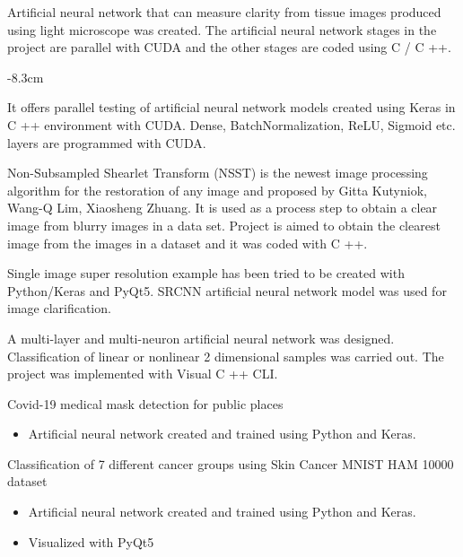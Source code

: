 \documentclass[10pt,a4paper]{altacv}
\begin{document}
 {}

Artificial neural network that can measure clarity from tissue images produced using light microscope was created. The artificial neural network stages in the project are parallel with CUDA and the other stages are coded using C / C ++.

\divider

\smallskip


\begin{adjustwidth}{}{-8.3cm}

It offers parallel testing of artificial neural network models created using Keras in C ++ environment with CUDA. Dense, BatchNormalization, ReLU, Sigmoid etc. layers are programmed with CUDA.

\divider

Non-Subsampled Shearlet Transform (NSST) is the newest image processing algorithm for the restoration of any image and proposed by Gitta Kutyniok, Wang-Q Lim, Xiaosheng Zhuang. It is used as a process step to obtain a clear image from blurry images in a data set. Project is aimed to obtain the clearest image from the images in a dataset and it was coded with C ++.

\divider

Single image super resolution example has been tried to be created with Python/Keras and PyQt5. SRCNN artificial neural network model was used for image clarification.

\divider

A multi-layer and multi-neuron artificial neural network was designed. Classification of linear or nonlinear 2 dimensional samples was carried out. The project was implemented with Visual C ++ CLI.

\divider

Covid-19 medical mask detection for public places
\begin{itemize}
    \item Artificial neural network created and trained using Python and Keras.
\end{itemize}

\divider

Classification of 7 different cancer groups using Skin Cancer MNIST HAM 10000 dataset
\begin{itemize}
    \item Artificial neural network created and trained using Python and Keras.
    \item Visualized with PyQt5
\end{itemize}


\end{adjustwidth}
\end{document}
